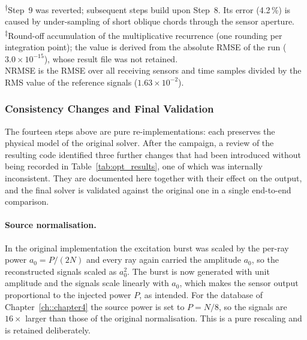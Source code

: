 \begin{table}[htbp]
                \medskip
                {\footnotesize \textsuperscript{$\dagger$}Step~9 was reverted;
                subsequent steps build upon Step~8. Its error (4.2\,\%) is caused by
                under-sampling of short oblique chords through the sensor aperture.\\
                \textsuperscript{$\ddagger$}Round-off accumulation of the multiplicative
                recurrence (one rounding per integration point); the value is derived
                from the absolute RMSE of the run ($3.0\times10^{-15}$), whose result file
                was not retained.\\
                NRMSE is the RMSE over all receiving sensors and time samples divided by
                the RMS value of the reference signals ($1.63\times10^{-2}$).}
            \end{table}


        \subsubsection{Consistency Changes and Final Validation}
        \label{ssec:opt_consistency}

            The fourteen steps above are pure re-implementations: each preserves the physical model of the original solver. After the campaign, a review of the resulting code identified three further changes that had been introduced without being recorded in Table~\ref{tab:opt_results}, one of which was internally inconsistent. They are documented here together with their effect on the output, and the final solver is validated against the original one in a single end-to-end comparison.

            \paragraph*{Source normalisation.}
            In the original implementation the excitation burst was scaled by the per-ray power $a_0 = P/(2N)$ and every ray again carried the amplitude $a_0$, so the reconstructed signals scaled as $a_0^2$. The burst is now generated with unit amplitude and the signals scale linearly with $a_0$, which makes the sensor output proportional to the injected power $P$, as intended. For the database of Chapter~\ref{ch::chapter4} the source power is set to $P = N/8$, so the signals are $16\times$ larger than those of the original normalisation. This is a pure rescaling and is retained deliberately.

